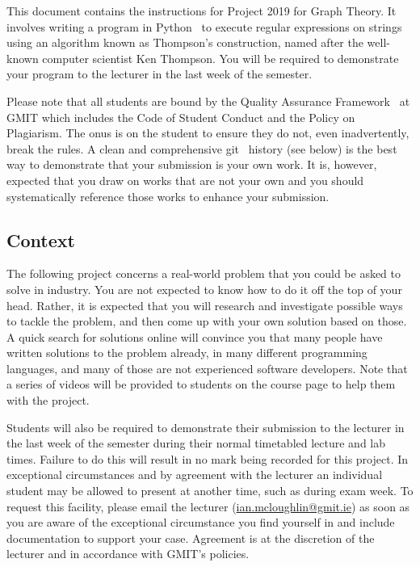 \documentclass[12pt, a4paper]{article}
\title{\projectname}
\author{\modulename}
\date{Due: \duedate}
\newcommand{\modulename}{Graph Theory}
\newcommand{\projectyear}{2019}
\newcommand{\projectname}{Project \projectyear}
\begin{document}
\maketitle

\noindent
This document contains the instructions for \projectname{} for \modulename{}.
It involves writing a program in Python~\cite{python} to execute regular expressions on strings using an algorithm known as Thompson's construction, named after the well-known computer scientist Ken Thompson.
You will be required to demonstrate your program to the lecturer in the last week of the semester.

Please note that all students are bound by the Quality Assurance Framework~\cite{gmitqaf} at GMIT which includes the Code of Student Conduct and the Policy on Plagiarism.
The onus is on the student to ensure they do not, even inadvertently, break the rules.
A clean and comprehensive git~\cite{git} history (see below) is the best way to demonstrate that your submission is your own work.
It is, however, expected that you draw on works that are not your own and you should systematically reference those works to enhance your submission.

\subsection*{Context}
The following project concerns a real-world problem that you could be asked to solve in industry.
You are not expected to know how to do it off the top of your head.
Rather, it is expected that you will research and investigate possible ways to tackle the problem, and then come up with your own solution based on those.
A quick search for solutions online will convince you that many people have written solutions to the problem already, in many different programming languages, and many of those are not experienced software developers.
Note that a series of videos will be provided to students on the course page to help them with the project.

Students will also be required to demonstrate their submission to the lecturer in the last week of the semester during their normal timetabled lecture and lab times.
Failure to do this will result in no mark being recorded for this project.
In exceptional circumstances and by agreement with the lecturer an individual student may be allowed to present at another time, such as during exam week.
To request this facility, please email the lecturer (\url{ian.mcloughlin@gmit.ie}) as soon as you are aware of the exceptional circumstance you find yourself in and include documentation to support your case.
Agreement is at the discretion of the lecturer and in accordance with GMIT's policies.
\end{document}
